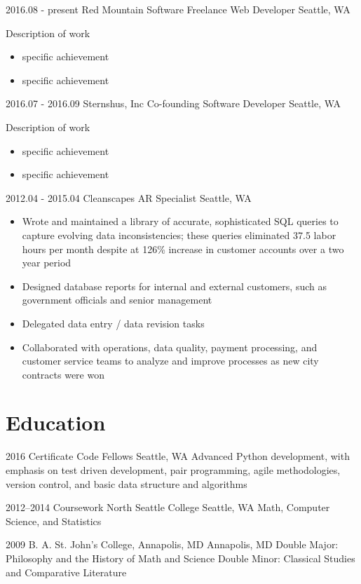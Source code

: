 \documentclass[10pt,a4paper,sans]{moderncv}        %
\begin{document}
\cventry
{2016.08 - present}
{Red Mountain Software}
{Freelance Web Developer}
{}
{Seattle, WA}
{Description of work
    \begin{itemize}
    \item specific achievement
    \item specific achievement
    \end{itemize}}

\cventry
{2016.07 - 2016.09}
{Sternshus, Inc}
{Co-founding Software Developer}
{}
{Seattle, WA}
{Description of work
    \begin{itemize}
    \item specific achievement
    \item specific achievement
    \end{itemize}}

\cventry
{2012.04 - 2015.04}
{Cleanscapes}
{AR Specialist}
{}
{Seattle, WA}
{
    \begin{itemize}
    \item Wrote and maintained a library of accurate, sophisticated SQL queries
      to capture evolving data inconsistencies; these queries eliminated 37.5
      labor hours per month despite at 126\% increase in customer accounts over
      a two year period
    \item Designed database reports for internal and external customers, such as
      government officials and senior management
    \item Delegated data entry / data revision tasks
      \item Collaborated with operations, data quality, payment processing, and
        customer service teams to analyze and improve processes as new city
        contracts were won
    \end{itemize}}

\section{Education}
\cventry
{2016}
{Certificate}
{Code Fellows}
{Seattle, WA}
{}
{Advanced Python development, with emphasis on test driven development, pair
  programming, agile methodologies, version control, and basic data structure
  and algorithms}

\cventry
{2012--2014}
{Coursework}
{North Seattle College}
{Seattle, WA}
{}
{Math, Computer Science, and Statistics}

\cventry
{2009}
{B. A.}
{St. John's College, Annapolis, MD}
{Annapolis, MD}
{}
{Double Major: Philosophy and the History of Math and Science\newline{}
Double Minor: Classical Studies and Comparative Literature}
\end{document}
